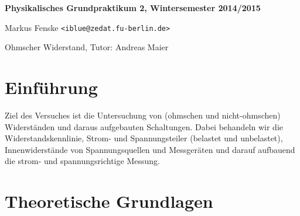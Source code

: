 \documentclass[a4paper,german,12pt,smallheadings]{scrartcl}
\begin{document}
\allowdisplaybreaks %
\begin{center}
\bfseries %
\sffamily %
\vspace{-40pt}
Physikalisches Grundpraktikum 2, Wintersemester 2014/2015

Markus Fenske \texttt{<iblue@zedat.fu-berlin.de>}

Ohmscher Widerstand, Tutor: Andreas Maier
\vspace{-10pt}
\end{center}
\section{Einführung}
Ziel des Versuches ist die Untersuchung von (ohmschen und nicht-ohmschen)
Widerständen und daraus aufgebauten Schaltungen. Dabei behandeln wir die
Widerstandskennlinie, Strom- und Spannungsteiler (belastet und unbelastet),
Innenwiderstände von Spannungsquellen und Messgeräten und darauf aufbauend die
strom- und spannungsrichtige Messung.

\section{Theoretische Grundlagen}
\end{document}
